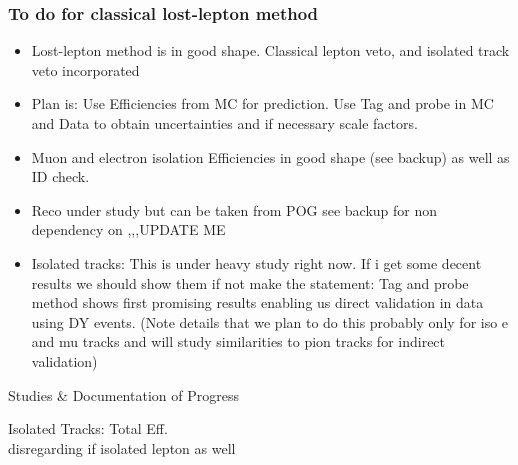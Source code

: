 \documentclass{beamer}
\begin{document}
\begin{frame}
 \frametitle{To do for classical lost-lepton method}
 \begin{itemize}
  \item Lost-lepton method is in good shape. Classical lepton veto, and isolated track veto incorporated
  \item Plan is: Use Efficiencies from MC for prediction. Use Tag and probe in MC and Data to obtain uncertainties and if necessary scale factors.
  \item Muon and electron isolation Efficiencies in good shape (see backup) as well as ID check.
  \item Reco under study but can be taken from POG see backup for non dependency on \HT,\MHT,\NJets,\BTags UPDATE ME
  \item Isolated tracks: This is under heavy study right now. If i get some decent results we should show them if not make the statement: Tag and probe method shows first promising results enabling us direct validation in data using DY events. (Note details that we plan to do this probably only for iso e and mu tracks and will study similarities to pion tracks for indirect validation)
 \end{itemize}

\end{frame}


\begin{frame}
 \begin{block}{}
 \centering
 \Large Studies \& Documentation of Progress
 \end{block}
\end{frame}


\begin{frame}
 \begin{block}{}
 \centering
 \Large Isolated Tracks: Total Eff. \\ disregarding if isolated lepton as well
 \end{block}
\end{frame}
\end{document}

